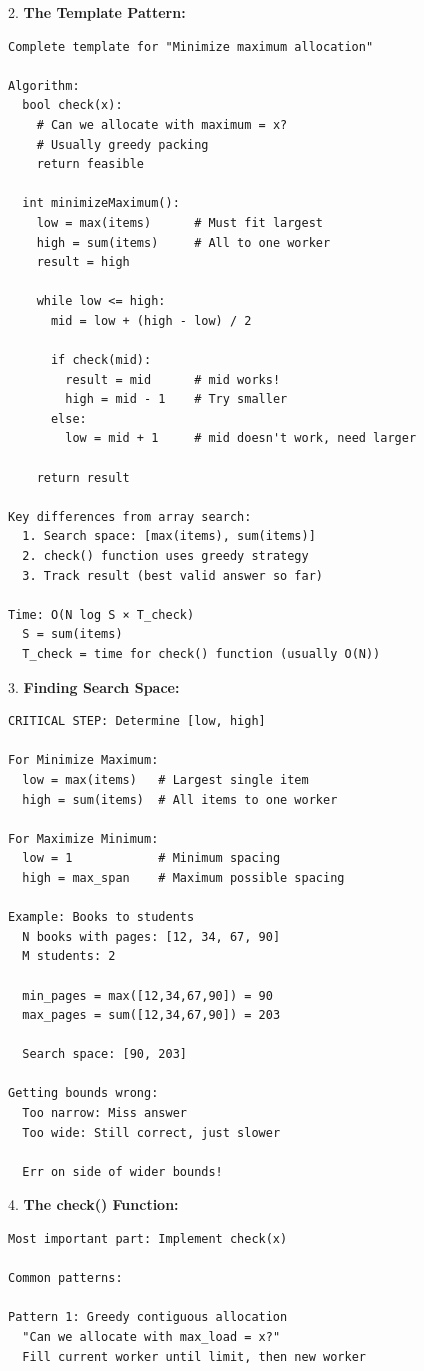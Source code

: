 \documentclass[11pt,a4paper,oneside]{book}
\begin{document}
\begin{tcolorbox}[
    enhanced,breakable,
    colback=white,
    colframe=deepblue,
    boxrule=1.5pt,
    arc=3mm,
    title=\textbf{The Allocation Paradigm}
]
2. \textbf{The Template Pattern:}
\begin{verbatim}
Complete template for "Minimize maximum allocation"

Algorithm:
  bool check(x):
    # Can we allocate with maximum = x?
    # Usually greedy packing
    return feasible
  
  int minimizeMaximum():
    low = max(items)      # Must fit largest
    high = sum(items)     # All to one worker
    result = high
    
    while low <= high:
      mid = low + (high - low) / 2
      
      if check(mid):
        result = mid      # mid works!
        high = mid - 1    # Try smaller
      else:
        low = mid + 1     # mid doesn't work, need larger
    
    return result

Key differences from array search:
  1. Search space: [max(items), sum(items)]
  2. check() function uses greedy strategy
  3. Track result (best valid answer so far)

Time: O(N log S × T_check)
  S = sum(items)
  T_check = time for check() function (usually O(N))
\end{verbatim}

3. \textbf{Finding Search Space:}
\begin{verbatim}
CRITICAL STEP: Determine [low, high]

For Minimize Maximum:
  low = max(items)   # Largest single item
  high = sum(items)  # All items to one worker

For Maximize Minimum:
  low = 1            # Minimum spacing
  high = max_span    # Maximum possible spacing

Example: Books to students
  N books with pages: [12, 34, 67, 90]
  M students: 2
  
  min_pages = max([12,34,67,90]) = 90
  max_pages = sum([12,34,67,90]) = 203
  
  Search space: [90, 203]

Getting bounds wrong:
  Too narrow: Miss answer
  Too wide: Still correct, just slower
  
  Err on side of wider bounds!
\end{verbatim}

4. \textbf{The check() Function:}
\begin{verbatim}
Most important part: Implement check(x)

Common patterns:

Pattern 1: Greedy contiguous allocation
  "Can we allocate with max_load = x?"
  Fill current worker until limit, then new worker


\end{verbatim}
\end{tcolorbox}
\end{document}
